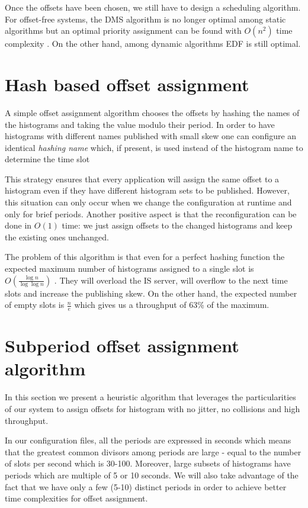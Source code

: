Once the offsets have been chosen, we still have to design a scheduling algorithm. For offset-free systems, the DMS algorithm is no longer optimal among static algorithms but an optimal priority assignment can be found with $O(n^2)$ time complexity \citep{audsley2001priority}. On the other hand, among dynamic algorithms EDF is still optimal. 

\section{Hash based offset assignment}

A simple offset assignment algorithm chooses the offsets by hashing the names of the histograms and taking the value modulo their period. In order to have histograms with different names published with small skew one can configure an identical \emph{hashing name} which, if present, is used instead of the histogram name to determine the time slot 

This strategy ensures that every application will assign the same offset to a histogram even if they have different histogram sets to be published. However, this situation can only occur when we change the configuration at runtime and only for brief periods. Another positive aspect is that the reconfiguration can be done in $O(1)$ time: we just assign offsets to the changed histograms and keep the existing ones unchanged.

The problem of this algorithm is that even for a perfect hashing function the expected maximum number of histograms assigned to a single slot is $O(\frac{\log n}{\log \log n})$ \citep{mitzenmacher1996power}. They will overload the IS server, will overflow to the next time slots and increase the publishing skew. On the other hand, the expected number of empty slots is $\frac n e$ which gives us a throughput of 63\% of the maximum.

\section{Subperiod offset assignment algorithm}

In this section we present a heuristic algorithm that leverages the particularities of our system to assign offsets for histogram with no jitter, no collisions and high throughput. 

In our configuration files, all the periods are expressed in seconds which means that the greatest common divisors among periods are large - equal to the number of slots per second which is 30-100. Moreover, large subsets of histograms have periods which are multiple of 5 or 10 seconds. We will also take advantage of the fact that we have only a few (5-10) distinct periods in order to achieve better time complexities for offset assignment.

